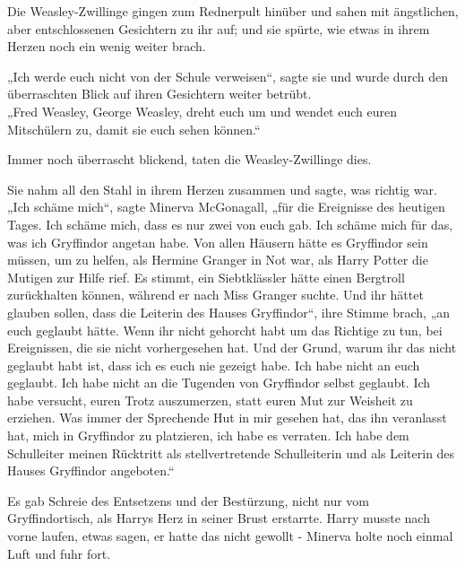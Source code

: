 {Die Weasley-Zwillinge gingen zum Rednerpult hinüber und sahen mit ängstlichen, aber entschlossenen Gesichtern zu ihr auf; und sie spürte, wie etwas in ihrem Herzen noch ein wenig weiter brach.

„Ich werde euch nicht von der Schule verweisen“, sagte sie und wurde durch den überraschten Blick auf ihren Gesichtern weiter betrübt.\\ „Fred Weasley, George Weasley, dreht euch um und wendet euch euren Mitschülern zu, damit sie euch sehen können.“

Immer noch überrascht blickend, taten die Weasley-Zwillinge dies.

Sie nahm all den Stahl in ihrem Herzen zusammen und sagte, was richtig war.\\ „Ich schäme mich“, sagte Minerva McGonagall, „für die Ereignisse des heutigen Tages. Ich schäme mich, dass es nur zwei von euch gab. Ich schäme mich für das, was ich Gryffindor angetan habe. Von allen Häusern hätte es Gryffindor sein müssen, um zu helfen, als Hermine Granger in Not war, als Harry Potter die Mutigen zur Hilfe rief. Es stimmt, ein Siebtklässler hätte einen Bergtroll zurückhalten können, während er nach Miss Granger suchte. Und ihr hättet glauben sollen, dass die Leiterin des Hauses Gryffindor“, ihre Stimme brach, „an euch geglaubt hätte. Wenn ihr nicht gehorcht habt um das Richtige zu tun, bei Ereignissen, die sie nicht vorhergesehen hat. Und der Grund, warum ihr das nicht geglaubt habt ist, dass ich es euch nie gezeigt habe. Ich habe nicht an euch geglaubt. Ich habe nicht an die Tugenden von Gryffindor selbst geglaubt. Ich habe versucht, euren Trotz auszumerzen, statt euren Mut zur Weisheit zu erziehen. Was immer der Sprechende Hut in mir gesehen hat, das ihn veranlasst hat, mich in Gryffindor zu platzieren, ich habe es verraten. Ich habe dem Schulleiter meinen Rücktritt als stellvertretende Schulleiterin und als Leiterin des Hauses Gryffindor angeboten.“

Es gab Schreie des Entsetzens und der Bestürzung, nicht nur vom Gryffindortisch, als Harrys Herz in seiner Brust erstarrte. Harry musste nach vorne laufen, etwas sagen, er hatte das nicht gewollt - Minerva holte noch einmal Luft und fuhr fort.

}

